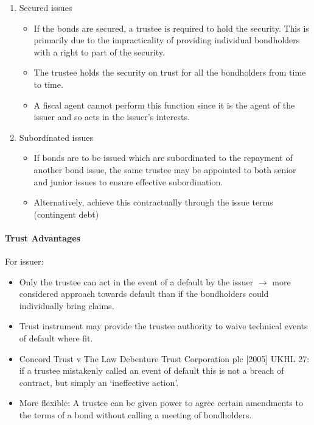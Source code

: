 \documentclass[
]{article}
\providecommand{\tightlist}{%
  \setlength{\itemsep}{0pt}\setlength{\parskip}{0pt}}
\begin{document}
\begin{enumerate}
\tightlist
\item
  Secured issues

  \begin{itemize}
  \tightlist
  \item
    If the bonds are secured, a trustee is required to hold the
    security. This is primarily due to the impracticality of providing
    individual bondholders with a right to part of the security.
  \item
    The trustee holds the security on trust for all the bondholders from
    time to time.
  \item
    A fiscal agent cannot perform this function since it is the agent of
    the issuer and so acts in the issuer's interests.
  \end{itemize}
\item
  Subordinated issues

  \begin{itemize}
  \tightlist
  \item
    If bonds are to be issued which are subordinated to the repayment of
    another bond issue, the same trustee may be appointed to both senior
    and junior issues to ensure effective subordination.
  \item
    Alternatively, achieve this contractually through the issue terms
    (contingent debt)
  \end{itemize}
\end{enumerate}

\hypertarget{trust-advantages}{%
\paragraph{Trust Advantages}\label{trust-advantages}}

For issuer:

\begin{itemize}
\tightlist
\item
  Only the trustee can act in the event of a default by the issuer
  {\(\rightarrow\)} more considered approach towards default than if the
  bondholders could individually bring claims.
\item
  Trust instrument may provide the trustee authority to waive technical
  events of default where fit.
\item
  Concord Trust v The Law Debenture Trust Corporation plc {[}2005{]}
  UKHL 27: if a trustee mistakenly called an event of default this is
  not a breach of contract, but simply an `ineffective action'.
\item
  More flexible: A trustee can be given power to agree certain
  amendments to the terms of a bond without calling a meeting of
  bondholders.
\end{itemize}
\end{document}
